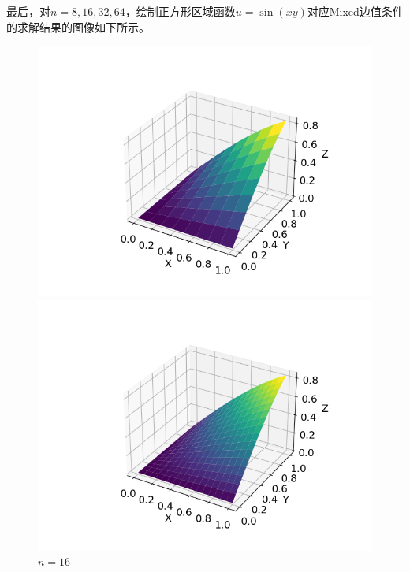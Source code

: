 \documentclass{ctexart}
\begin{document}
\begin{sloppypar}
最后，对$n=8,16,32,64$，绘制正方形区域函数$u = \sin(xy)$对应Mixed边值条件的求解结果的图像如下所示。
\begin{figure}[H]
  \begin{minipage}[t]{0.5\linewidth}
    \centering
    \includegraphics[scale = 0.5]{f3_M_8.png}
    \caption{$n = 8$}
  \end{minipage}
  \begin{minipage}[t]{0.5\linewidth}
    \centering
    \includegraphics[scale = 0.5]{f3_M_16.png}
    \caption{$n = 16$}
  \end{minipage}
  \label{fig2}
\end{figure}


\end{sloppypar}
\end{document}
